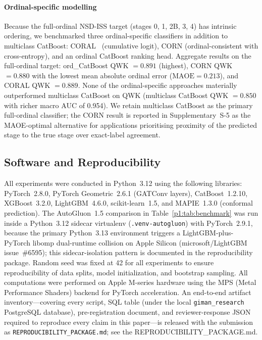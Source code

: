 \documentclass[10pt,letterpaper]{article}
\begin{document}
\paragraph*{Ordinal-specific modelling} Because the full-ordinal NSD-ISS target (stages 0, 1, 2B, 3, 4) has intrinsic ordering, we benchmarked three ordinal-specific classifiers in addition to multiclass CatBoost: CORAL~\cite{bonnier2022ordinal} (cumulative logit), CORN (ordinal-consistent with cross-entropy), and an ordinal CatBoost ranking head. Aggregate results on the full-ordinal target: ord\_CatBoost QWK $=0.891$ (highest), CORN QWK $=0.880$ with the lowest mean absolute ordinal error ($\mathrm{MAOE} = 0.213$), and CORAL QWK $=0.889$. None of the ordinal-specific approaches materially outperformed multiclass CatBoost on QWK (multiclass CatBoost QWK $=0.850$ with richer macro AUC of 0.954). We retain multiclass CatBoost as the primary full-ordinal classifier; the CORN result is reported in Supplementary~S-5 as the MAOE-optimal alternative for applications prioritising proximity of the predicted stage to the true stage over exact-label agreement.

\subsection*{Software and Reproducibility}
\label{p1:sec:methods:reproducibility}
All experiments were conducted in Python~3.12 using the following libraries: PyTorch~2.8.0, PyTorch Geometric~2.6.1 (GATConv layers), CatBoost~1.2.10, XGBoost~3.2.0, LightGBM~4.6.0, scikit-learn~1.5, and MAPIE~1.3.0 (conformal prediction). The AutoGluon~1.5 comparison in Table~\ref{p1:tab:benchmark} was run inside a Python~3.12 sidecar virtualenv (\texttt{.venv-autogluon}) with PyTorch~2.9.1, because the primary Python~3.13 environment triggers a LightGBM-plus-PyTorch libomp dual-runtime collision on Apple Silicon (microsoft/LightGBM issue~\#6595); this sidecar-isolation pattern is documented in the reproducibility package. Random seed was fixed at 42 for all experiments to ensure reproducibility of data splits, model initialization, and bootstrap sampling. All computations were performed on Apple M-series hardware using the MPS (Metal Performance Shaders) backend for PyTorch acceleration. An end-to-end artifact inventory---covering every script, SQL table (under the local \texttt{giman\_research} PostgreSQL database), pre-registration document, and reviewer-response JSON required to reproduce every claim in this paper---is released with the submission as \texttt{REPRODUCIBILITY\_PACKAGE.md}; see the REPRODUCIBILITY\_PACKAGE.md.
\end{document}
